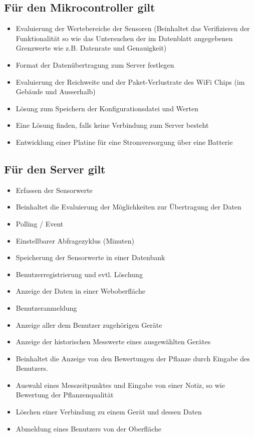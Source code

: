 \documentclass[pointlessnumbers]{scrartcl}
\begin{document}
\subsection*{Für den Mikrocontroller gilt}
\begin{itemize}
    \item Evaluierung der Wertebereiche der Sensoren (Beinhaltet das Verifizieren der Funktionalität so wie das Untersuchen der im Datenblatt angegebenen Grenzwerte wie z.B. Datenrate und Genauigkeit)
    \item Format der Datenübertragung zum Server festlegen 
    \item Evaluierung der Reichweite und der Paket-Verlustrate des WiFi Chips (im Gebäude und Ausserhalb)
    \item Lösung zum Speichern der Konfigurationsdatei und Werten 
    \item Eine Lösung finden, falls keine Verbindung zum Server besteht 
    \item Entwicklung einer Platine für eine Stromversorgung über eine Batterie 
\end{itemize}


\subsection*{Für den Server gilt}
\begin{itemize}
    \item Erfassen der Sensorwerte 
    \item Beinhaltet die Evaluierung der Möglichkeiten zur Übertragung der Daten 
    \item Polling / Event 
    \item Einstellbarer Abfragezyklus (Minuten) 
    \item Speicherung der Sensorwerte in einer Datenbank 
    \item Benutzerregistrierung und evtl. Löschung 
    \item Anzeige der Daten in einer Weboberfläche 
    \item Benutzeranmeldung 
    \item Anzeige aller dem Benutzer zugehörigen Geräte 
    \item Anzeige der historischen Messwerte eines ausgewählten Gerätes 
    \item Beinhaltet die Anzeige von den Bewertungen der Pflanze durch Eingabe des Benutzers. 
    \item Auswahl eines Messzeitpunktes und Eingabe von einer Notiz, so wie Bewertung der Pflanzenqualität 
    \item Löschen einer Verbindung zu einem Gerät und dessen Daten 
    \item Abmeldung eines Benutzers von der Oberfläche 
\end{itemize}
\end{document}
